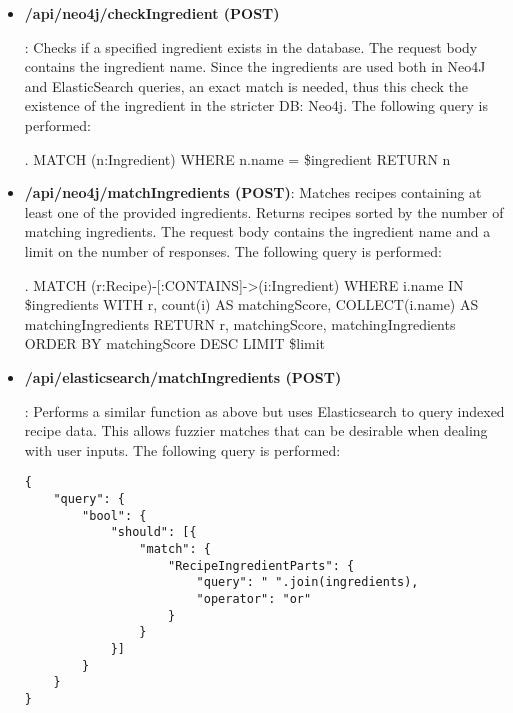 \begin{itemize}
\item\hypertarget{fun:checkIngredient} {\textbf{/api/neo4j/checkIngredient (POST)}}: Checks if a specified ingredient exists in the database. The request body contains the ingredient name. Since the ingredients are used both in Neo4J and ElasticSearch queries, an exact match is needed, thus this check the existence of the ingredient in the stricter DB: Neo4j. The following query is performed:
\begin{CypherQuery}
.
MATCH (n:Ingredient) WHERE n.name = \$ingredient RETURN n
\end{CypherQuery}

\item \textbf{/api/neo4j/matchIngredients (POST)}: Matches recipes containing at least one of the provided ingredients. Returns recipes sorted by the number of matching ingredients. The request body contains the ingredient name and a limit on the number of responses.
The following query is performed:
\begin{CypherQuery}
.
MATCH (r:Recipe)-[:CONTAINS]->(i:Ingredient)
WHERE i.name IN \$ingredients
WITH r, count(i) AS matchingScore, COLLECT(i.name) AS matchingIngredients
RETURN r, matchingScore, matchingIngredients ORDER BY matchingScore DESC
LIMIT \$limit
\end{CypherQuery}

\item \hypertarget{fun:elasticsearch/matchIngredients}{\textbf{/api/elasticsearch/matchIngredients (POST)}}: Performs a similar function as above but uses Elasticsearch to query indexed recipe data. This allows fuzzier matches that can be desirable when dealing with user inputs.
The following query is performed:
\begin{lstlisting}[language=Elasticsearch]
{
    "query": {
        "bool": {
            "should": [{
                "match": {
                    "RecipeIngredientParts": {
                        "query": " ".join(ingredients),
                        "operator": "or"
                    }
                }
            }]
        }
    }
}
\end{lstlisting}


\end{itemize}
